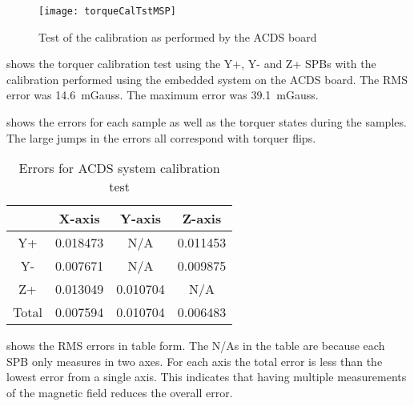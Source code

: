 \begin{figure}[!ht]
    \centering
    \texttt{[image: torqueCalTstMSP]}
    \caption{Test of the calibration as performed by the \ac{ACDS} board}
    \label{fig:tcalMSP}
\end{figure}

 shows the torquer calibration test using the Y+, Y- and Z+ \acp{SPB} with the calibration performed using the embedded system on the \ac{ACDS} board. The RMS error was 14.6~mGauss. The maximum error was 39.1~mGauss.


 shows the errors for each sample as well as the torquer states during the samples. The large jumps in the errors all correspond with torquer flips.

\begin{table}[!ht]
    \centering
    \caption{Errors for \ac{ACDS} system calibration test}
    \label{tab:tcalMSPerr}
    \begin{tabular}{|c|c|c|c|}
        \hline
        &X-axis&Y-axis&Z-axis\\
        \hline
        Y+&0.018473&N/A&0.011453\\
        \hline
        Y-&0.007671&N/A&0.009875\\
        \hline
        Z+&0.013049&0.010704&N/A\\
        \hline
        Total&0.007594&0.010704&0.006483\\
        \hline
    \end{tabular}
\end{table}

 shows the RMS errors in table form. The N/As in the table are because each \ac{SPB} only measures in two axes. For each axis the total error is less than the lowest error from a single axis. This indicates that having multiple measurements of the magnetic field reduces the overall error.


